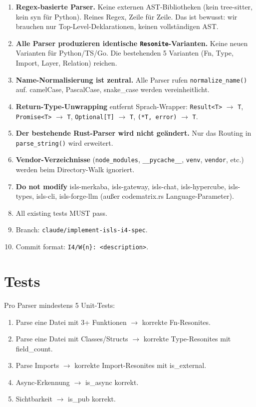 \documentclass[11pt,a4paper]{article}
\begin{document}
\begin{enumerate}
\item \textbf{Regex-basierte Parser.} Keine externen 
      AST-Bibliotheken (kein tree-sitter, kein syn f\"ur 
      Python). Reines Regex, Zeile f\"ur Zeile. Das ist 
      bewusst: wir brauchen nur Top-Level-Deklarationen, 
      keinen vollst\"andigen AST.
\item \textbf{Alle Parser produzieren identische 
      \texttt{Resonite}-Varianten.} Keine neuen Varianten 
      f\"ur Python/TS/Go. Die bestehenden 5 Varianten 
      (Fn, Type, Import, Layer, Relation) reichen.
\item \textbf{Name-Normalisierung ist zentral.} Alle Parser 
      rufen \texttt{normalize\_name()} auf. camelCase, 
      PascalCase, snake\_case werden vereinheitlicht.
\item \textbf{Return-Type-Unwrapping} entfernt 
      Sprach-Wrapper: \texttt{Result<T>} $\to$ \texttt{T}, 
      \texttt{Promise<T>} $\to$ \texttt{T}, 
      \texttt{Optional[T]} $\to$ \texttt{T}, 
      \texttt{(*T, error)} $\to$ \texttt{T}.
\item \textbf{Der bestehende Rust-Parser wird nicht 
      ge\"andert.} Nur das Routing in \texttt{parse\_string()} 
      wird erweitert.
\item \textbf{Vendor-Verzeichnisse} (\texttt{node\_modules}, 
      \texttt{\_\_pycache\_\_}, \texttt{venv}, \texttt{vendor}, 
      etc.) werden beim Directory-Walk ignoriert.
\item \textbf{Do not modify} isls-merkaba, isls-gateway, 
      isls-chat, isls-hypercube, isls-types, isls-cli, 
      isls-forge-llm (au{\ss}er codematrix.rs Language-Parameter).
\item All existing tests MUST pass.
\item Branch: \texttt{claude/implement-isls-i4-spec}.
\item Commit format: \texttt{I4/W\{n\}: <description>}.
\end{enumerate}


\section{Tests}

Pro Parser mindestens 5 Unit-Tests:

\begin{enumerate}[nosep]
\item Parse eine Datei mit 3+ Funktionen $\to$ korrekte 
      Fn-Resonites.
\item Parse eine Datei mit Classes/Structs $\to$ korrekte 
      Type-Resonites mit field\_count.
\item Parse Imports $\to$ korrekte Import-Resonites mit 
      is\_external.
\item Async-Erkennung $\to$ is\_async korrekt.
\item Sichtbarkeit $\to$ is\_pub korrekt.
\end{enumerate}
\end{document}

